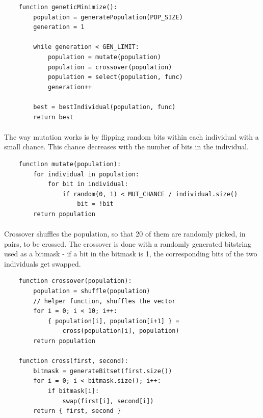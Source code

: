 \documentclass{article}
\begin{document}
    \begin{verbatim}
    function geneticMinimize():
        population = generatePopulation(POP_SIZE)
        generation = 1

        while generation < GEN_LIMIT:
            population = mutate(population)
            population = crossover(population)
            population = select(population, func)
            generation++
        
        best = bestIndividual(population, func)
        return best
    \end{verbatim}

    \paragraph{}
    The way mutation works is by flipping random bits within each individual with a small chance. This chance decreases with the number of bits in the individual.

    \begin{verbatim}
    function mutate(population):
        for individual in population:
            for bit in individual:
                if random(0, 1) < MUT_CHANCE / individual.size()
                    bit = !bit
        return population
    \end{verbatim}

    \paragraph{}
    Crossover shuffles the population, so that 20 of them are randomly picked, in pairs, to be crossed. The crossover is done with a randomly generated bitstring used as a bitmask - if a bit in the bitmask is 1, the corresponding bits of the two individuals get swapped.

    \begin{verbatim}
    function crossover(population):
        population = shuffle(population) 
        // helper function, shuffles the vector
        for i = 0; i < 10; i++:
            { population[i], population[i+1] } = 
                cross(population[i], population)
        return population

    function cross(first, second):
        bitmask = generateBitset(first.size())
        for i = 0; i < bitmask.size(); i++:
            if bitmask[i]:
                swap(first[i], second[i])
        return { first, second }
    \end{verbatim}
    
\end{document}
